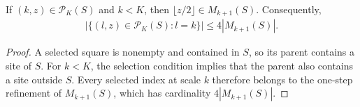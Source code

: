 \begin{lemma}
    \label{thm:area_law_capped_mixed_parents}
    \leanok
    If $(k,z)\in\mathcal P_K(S)$ and $k<K$, then
    $\lfloor z/2\rfloor\in M_{k+1}(S)$. Consequently,
    \begin{align}
        \bigl|\{(l,z)\in\mathcal P_K(S):l=k\}\bigr|\le4|M_{k+1}(S)|.
    \end{align}
\end{lemma}
\begin{proof}\leanok
    A selected square is nonempty and contained in $S$, so its parent contains
    a site of $S$. For $k<K$, the selection condition implies that the parent
    also contains a site outside $S$. Every selected index at scale $k$
    therefore belongs to the one-step refinement of $M_{k+1}(S)$, which has
    cardinality $4|M_{k+1}(S)|$.
\end{proof}

